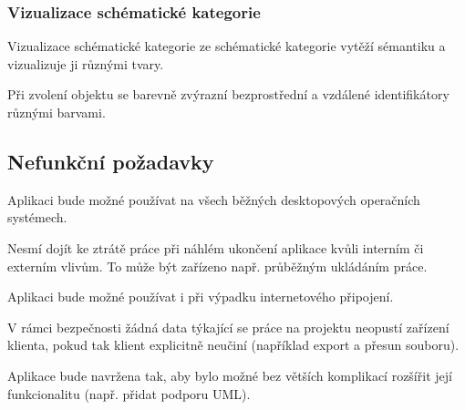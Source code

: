 \subsubsection*{Vizualizace schématické kategorie}
\begin{enumfp}[resume]
  \item Vizualizace schématické kategorie ze schématické kategorie vytěží sémantiku a vizualizuje ji různými tvary.
  \item Při zvolení objektu se barevně zvýrazní bezprostřední a vzdálené identifikátory různými barvami.
\end{enumfp}

\subsection{Nefunkční požadavky}

\begin{enumnfp}
  \item Aplikaci bude možné používat na všech běžných desktopových operačních systémech.
  \item Nesmí dojít ke ztrátě práce při náhlém ukončení aplikace kvůli interním či externím vlivům.
  To může být zařízeno např. průběžným ukládáním práce.
  \item Aplikaci bude možné používat i při výpadku internetového připojení.
  \item V rámci bezpečnosti žádná data týkající se práce na projektu neopustí zařízení klienta, pokud tak klient explicitně neučiní (například export a přesun souboru).
  \item Aplikace bude navržena tak, aby bylo možné bez větších komplikací rozšířit její funkcionalitu (např. přidat podporu UML).
\end{enumnfp}
